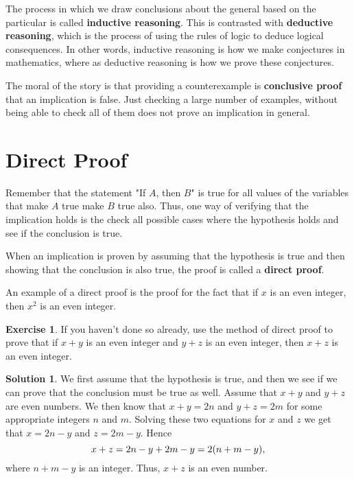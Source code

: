 \documentclass[a4paper, 11pt]{report}
\theoremstyle{plain}
\theoremstyle{definition}
\newtheorem{exrc}[thm]{Exercise}
\newtheorem*{sltn}{Solution}
\begin{document}
The process in which we draw conclusions about the general based on the
particular is called \textbf{inductive reasoning}.
This is contrasted with \textbf{deductive reasoning}, which is the process of using the rules of logic to deduce logical
consequences.  In other words, inductive reasoning is how we make conjectures
in mathematics, where as deductive reasoning is how we prove these conjectures.

The moral of the story is that providing a counterexample is \textbf{conclusive
proof} that an implication is false. Just checking a
large number of examples, without being able to check all of them does not
prove an implication in general.

\section{Direct Proof}
\label{sec:direct_proof}

Remember that the statement "If $A$, then $B$" is true for all values of the
variables that make $A$ true make $B$ true also. Thus, one way of verifying
that the implication holds is the check all possible cases where the hypothesis
holds and see if the conclusion is true.

When an implication is proven by assuming that the hypothesis is true and then
showing that the conclusion is also true, the proof is called a \textbf{direct
proof}.

An example of a direct proof is the proof for the fact that if $x$ is an even
integer, then $x^2$ is an even integer.

\begin{exrc}
  If you haven't done so already, use the method of direct proof to prove that
  if $x + y$ is an even integer and $y + z$ is an even integer, then $x + z$
  is an even integer.
\end{exrc}
\begin{sltn}
  We first assume that the hypothesis is true, and then we see if we can prove
  that the conclusion must be true as well. Assume that $x + y$ and $y + z$ are
  even numbers.  We then know that $x + y = 2n$ and $y + z = 2m$ for some
  appropriate integers $n$ and $m$.  Solving these two equations for $x$ and
  $z$ we get that $x = 2n - y$ and $z = 2m - y$. Hence 
  \begin{equation}
    \notag
    x + z = 2n - y + 2m - y = 2(n + m - y),
  \end{equation}
  where $n + m - y$ is an integer. Thus, $x + z$ is an even number. 
\end{sltn}
\end{document}
